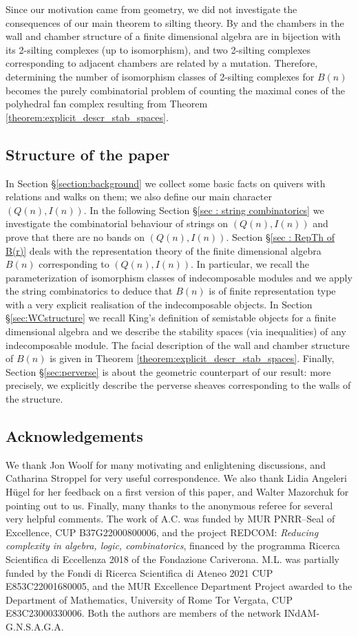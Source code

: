 \documentclass[11pt]{amsart}
\theoremstyle{definition}
\begin{document}
Since our motivation came from geometry, we did not investigate the consequences of our main theorem to silting theory. By \cite{asai} and \cite{BST19} the chambers in the wall and chamber structure of a finite dimensional algebra are in bijection with its 2-silting complexes (up to isomorphism), and two 2-silting complexes corresponding to adjacent chambers are related by a mutation. Therefore, determining
the number of isomorphism classes of 2-silting complexes for $B(n)$ becomes the purely combinatorial problem of counting the maximal cones of the polyhedral fan complex resulting from Theorem \ref{theorem:explicit_descr_stab_spaces}. 

\subsection{Structure of the paper} In Section \S\ref{section:background} we collect some basic facts on quivers with relations and walks on them; we also define our main character $(Q(n), I(n))$. In the following Section \S\ref{sec : string combinatorics} we investigate the combinatorial behaviour of strings on $(Q(n), I(n))$ and prove that there are no bands  on $(Q(n), I(n))$. Section \S\ref{sec : RepTh of B(r)} deals with the representation theory of the finite dimensional algebra $B(n)$ corresponding to $(Q(n), I(n))$. In particular, we recall the parameterization of isomorphism classes of indecomposable modules and we apply the string combinatorics to deduce that $B(n)$ is of finite representation type with a very explicit realisation of the indecomposable objects.  In Section \S\ref{sec:WCstructure} we recall King's definition of semistable objects for a finite dimensional algebra and we describe the stability spaces (via inequalities) of any indecomposable module. The facial description of the wall and chamber structure of $B(n)$ is given in Theorem \ref{theorem:explicit_descr_stab_spaces}. Finally, Section \S\ref{sec:perverse} is about the geometric counterpart of our result: more precisely, we explicitly describe the perverse sheaves corresponding to the walls of the structure. 


\subsection*{Acknowledgements} 
We thank Jon Woolf for many motivating and enlightening discussions, and Catharina Stroppel for very useful correspondence. We also thank Lidia Angeleri H\"ugel for her feedback on a first version of this paper, and Walter Mazorchuk for pointing out \cite{Pe} to us. Finally, many thanks to the anonymous referee for several very helpful comments. The work of A.C. was funded by MUR PNRR--Seal of Excellence,
CUP B37G22000800006, and the project REDCOM: \emph{Reducing complexity in algebra, logic, combinatorics}, financed by the programma Ricerca Scientifica di Eccellenza 2018 of the Fondazione Cariverona. M.L. was partially funded by the Fondi di Ricerca Scientifica di Ateneo 2021 CUP E853C22001680005, and the MUR Excellence Department Project awarded to the Department of Mathematics, University of Rome Tor Vergata, CUP E83C23000330006. Both the authors are members of the network INdAM-G.N.S.A.G.A.
\end{document}
